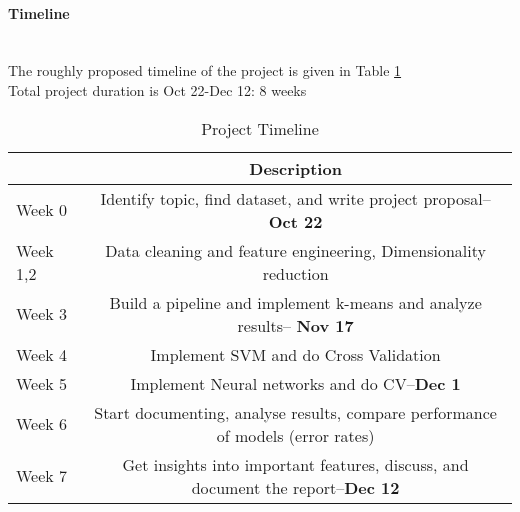 \documentclass[11pt,letterpaper]{article}
\begin{document}
\paragraph{Timeline}\text{}\\
The roughly proposed timeline of the project is given in Table \ref{tab:timeline}\\
Total project duration is Oct 22-Dec 12: 8 weeks
\begin{table}[h!]
    \centering
    \begin{tabular}{l|c}
         \hline
        & Description \\
         \hline
        Week 0 & Identify topic, find dataset, and write project proposal--\textbf{Oct 22}\\
        Week 1,2 & Data cleaning and feature engineering, Dimensionality reduction\\
        Week 3 & Build a pipeline and implement k-means and analyze results-- \textbf{Nov 17}\\
        Week 4 & Implement SVM and do Cross Validation \\
        Week 5 & Implement Neural networks and do CV--\textbf{Dec 1}\\
        Week 6 & Start documenting, analyse results, compare performance of models (error rates) \\
        Week 7 & Get insights into important features, discuss, and document the report--\textbf{Dec 12}\\
        \hline
    \end{tabular}
    \caption{Project Timeline}
    \label{tab:timeline}
\end{table}
\end{document}
